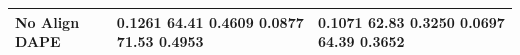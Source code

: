 \begin{tabular}{lll}
\toprule
No Align DAPE & 0.1261 64.41 0.4609 0.0877 71.53 0.4953 & 0.1071 62.83 0.3250 0.0697 64.39 0.3652 \\
\midrule
\bottomrule
\end{tabular}
